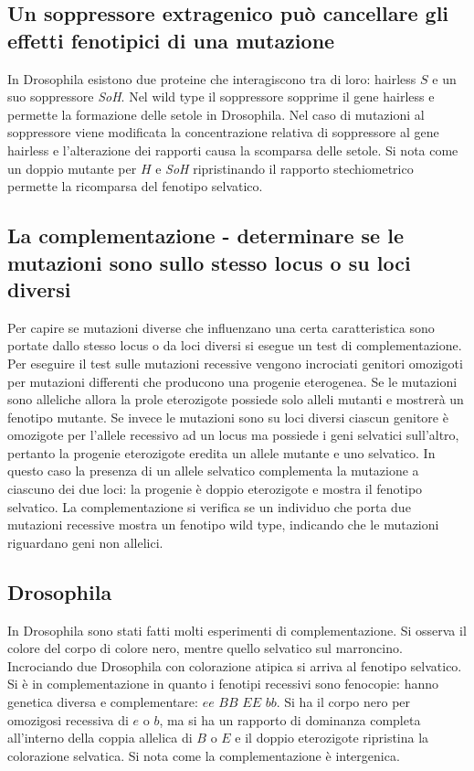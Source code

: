 \subsection{Un soppressore extragenico pu\`o cancellare gli effetti fenotipici di una mutazione}
In Drosophila esistono due proteine che interagiscono tra di loro: hairless $S$ e un suo soppressore \emph{SoH}. Nel wild type il soppressore sopprime il gene hairless e permette la formazione delle 
setole in Drosophila. Nel caso di mutazioni al soppressore viene modificata la concentrazione relativa di soppressore al gene hairless e l'alterazione dei rapporti causa la scomparsa delle setole.
Si nota come un doppio mutante per $H$ e \emph{SoH} ripristinando il rapporto stechiometrico permette la ricomparsa del fenotipo selvatico.
\subsection{La complementazione - determinare se le mutazioni sono sullo stesso locus o su loci diversi}
Per capire se mutazioni diverse che influenzano una certa caratteristica sono portate dallo stesso locus o da loci diversi si esegue un test di complementazione. Per eseguire il test sulle mutazioni 
recessive vengono incrociati genitori omozigoti per mutazioni differenti che producono una progenie eterogenea. Se le mutazioni sono alleliche allora la prole eterozigote possiede solo alleli mutanti
e mostrer\`a un fenotipo mutante. Se invece le mutazioni sono su loci diversi ciascun genitore \`e omozigote per l'allele recessivo ad un locus ma possiede i geni selvatici sull'altro, pertanto 
la progenie eterozigote eredita un allele mutante e uno selvatico. In questo caso la presenza di un allele selvatico complementa la mutazione a ciascuno dei due loci: la progenie \`e doppio eterozigote
e mostra il fenotipo selvatico. La complementazione si verifica se un individuo che porta due mutazioni recessive mostra un fenotipo wild type, indicando che le mutazioni riguardano geni non allelici. 
\subsection{Drosophila}
In Drosophila sono stati fatti molti esperimenti di complementazione. Si osserva il colore del corpo di colore nero, mentre quello selvatico sul marroncino. Incrociando due 
Drosophila con colorazione atipica si arriva al fenotipo selvatico. Si \`e in complementazione in quanto i fenotipi recessivi sono fenocopie: hanno genetica diversa e complementare:
$ee$ $BB$ $EE$ $bb$. Si ha il corpo nero per omozigosi recessiva di $e$ o $b$, ma si ha un rapporto di dominanza completa all'interno della coppia allelica di $B$ o $E$ e il doppio 
eterozigote ripristina la colorazione selvatica. Si nota come la complementazione \`e intergenica. 
